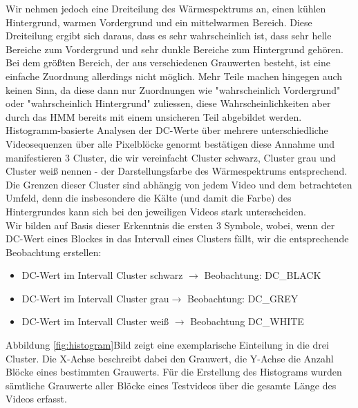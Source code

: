 Wir nehmen jedoch eine Dreiteilung des Wärmespektrums an, einen kühlen Hintergrund, warmen Vordergrund und ein mittelwarmen Bereich.
Diese Dreiteilung ergibt sich daraus, dass es sehr wahrscheinlich ist, dass sehr helle Bereiche zum Vordergrund und sehr dunkle Bereiche zum Hintergrund gehören.
Bei dem größten Bereich, der aus verschiedenen Grauwerten besteht, ist eine einfache Zuordnung allerdings nicht möglich. Mehr Teile machen hingegen auch keinen Sinn, da diese dann nur Zuordnungen wie "wahrscheinlich Vordergrund" oder "wahrscheinlich Hintergrund" zuliessen, diese Wahrscheinlichkeiten aber durch das HMM bereits mit einem unsicheren Teil abgebildet werden.
Histogramm-basierte Analysen der DC-Werte über mehrere unterschiedliche Videosequenzen über alle Pixelblöcke genormt bestätigen diese Annahme und manifestieren 3 Cluster, die wir vereinfacht Cluster schwarz, Cluster grau und Cluster weiß nennen - der Darstellungsfarbe des Wärmespektrums entsprechend.
Die Grenzen dieser Cluster sind abhängig von jedem Video und dem betrachteten Umfeld, denn die insbesondere die Kälte (und damit die Farbe) des Hintergrundes kann sich bei den jeweiligen Videos stark unterscheiden.\\
Wir bilden auf Basis dieser Erkenntnis die ersten 3 Symbole, wobei, wenn der DC-Wert eines Blockes in das Intervall eines Clusters fällt, wir die entsprechende Beobachtung erstellen:
\begin{itemize}
	\item DC-Wert im Intervall Cluster schwarz $\rightarrow$ Beobachtung: DC\_BLACK
	\item DC-Wert im Intervall Cluster grau$\rightarrow$ Beobachtung: DC\_GREY
	\item DC-Wert im Intervall Cluster weiß $\rightarrow$ Beobachtung DC\_WHITE
\end{itemize}
Abbildung \ref{fig:histogram}Bild zeigt eine exemplarische Einteilung in die drei Cluster.
Die X-Achse beschreibt dabei den Grauwert, die Y-Achse die Anzahl Blöcke eines bestimmten Grauwerts.
Für die Erstellung des Histograms wurden sämtliche Grauwerte aller Blöcke eines Testvideos über die gesamte Länge des Videos erfasst.
